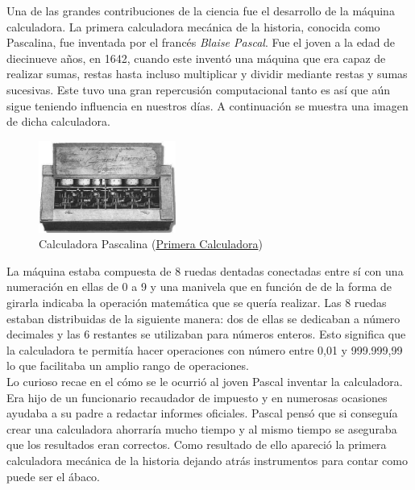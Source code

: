 Una de las grandes contribuciones de la ciencia fue el desarrollo de la máquina calculadora. La primera calculadora mecánica de la historia, conocida como Pascalina, fue inventada por el francés \textit{Blaise Pascal}. Fue el joven a la edad de diecinueve años, en 1642, cuando este inventó una máquina que era capaz de realizar sumas, restas hasta incluso multiplicar y dividir mediante restas y sumas sucesivas. Este tuvo una gran repercusión computacional tanto es así que aún sigue teniendo influencia en nuestros días. A continuación se muestra una imagen de dicha calculadora.

\begin{figure}[H]
\begin{center}
  \includegraphics[width=0.4\textwidth]{./EtapaPrimeriza/imagenes/cp.jpg}
  \caption{Calculadora Pascalina (\href{https://www.tispain.com/2014/11/la-pascalina-la-primera-calculadora.html} {Primera Calculadora})}
  \label{cp}
\end{center}
\end{figure}

La máquina estaba compuesta de 8 ruedas dentadas conectadas entre sí con una numeración en ellas de 0 a 9 y una manivela que en función de de la forma de girarla indicaba la operación matemática que se quería realizar. Las 8 ruedas estaban distribuidas de la siguiente manera: dos de ellas se dedicaban a número decimales y las 6 restantes se utilizaban para números enteros. Esto significa que la calculadora te permitía hacer operaciones con número entre 0,01 y 999.999,99 lo que facilitaba un amplio rango de operaciones.\\

Lo curioso recae en el cómo se le ocurrió al joven Pascal inventar la calculadora. Era hijo de un funcionario recaudador de impuesto y en numerosas ocasiones ayudaba a su padre a redactar informes oficiales. Pascal pensó que si conseguía crear una calculadora ahorraría mucho tiempo y al mismo tiempo se aseguraba que los resultados eran correctos. Como resultado de ello apareció la primera calculadora mecánica de la historia dejando atrás instrumentos para contar como puede ser el ábaco.
